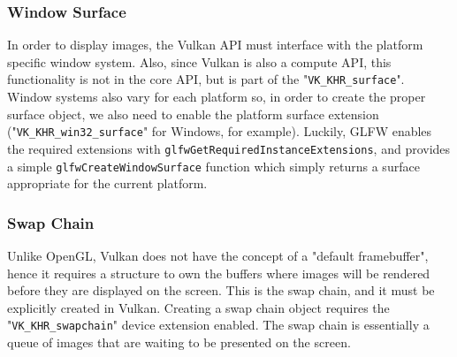 \subsubsection{Window Surface}
In order to display images, the Vulkan API must interface with the platform specific window system. Also, since Vulkan is also a compute API, this functionality is not in the core API, but is part of the "\texttt{VK\_KHR\_surface}". Window systems also vary for each platform so, in order to create the proper surface object, we also need to enable the platform surface extension ("\texttt{VK\_KHR\_win32\_surface}" for Windows, for example). Luckily, GLFW enables the required extensions with \texttt{glfwGetRequiredInstanceExtensions}, and provides a simple \texttt{glfwCreateWindowSurface} function which simply returns a surface appropriate for the current platform.

\subsubsection{Swap Chain}
Unlike OpenGL, Vulkan does not have the concept of a "default framebuffer", hence it requires a structure to own the buffers where images will be rendered before they are displayed on the screen. This is the swap chain, and it must be explicitly created in Vulkan. Creating a swap chain object requires the "\texttt{VK\_KHR\_swapchain}" device extension enabled. The swap chain is essentially a queue of images that are waiting to be presented on the screen.

